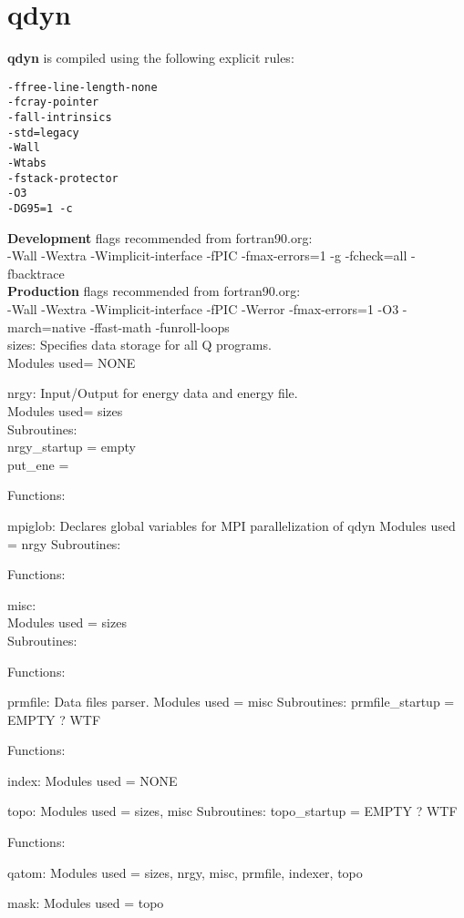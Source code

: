 \documentclass[10pt, oneside, pdftex]{article}
\begin{document}
\section{qdyn}
\label{qdyn}
\textbf{qdyn} is compiled using the following explicit rules:
\begin{Verbatim}
-ffree-line-length-none
-fcray-pointer
-fall-intrinsics
-std=legacy
-Wall
-Wtabs
-fstack-protector
-O3
-DG95=1 -c
\end{Verbatim}

\textbf{Development} flags recommended from fortran90.org:\\
-Wall -Wextra -Wimplicit-interface -fPIC -fmax-errors=1 -g -fcheck=all -fbacktrace\\

\textbf{Production} flags recommended from fortran90.org:\\
-Wall -Wextra -Wimplicit-interface -fPIC -Werror -fmax-errors=1 -O3 -march=native -ffast-math -funroll-loops\\

sizes: Specifies data storage for all Q programs.\\
Modules used= NONE

nrgy: Input/Output for energy data and energy file.\\
Modules used= sizes\\
Subroutines:\\
  nrgy\_startup = empty\\
  put\_ene =

Functions:

mpiglob: Declares global variables for MPI parallelization of qdyn
Modules used = nrgy
Subroutines:

Functions:


misc:\\
Modules used = sizes\\
Subroutines:

Functions:


prmfile: Data files parser.
Modules used = misc
Subroutines:
  prmfile\_startup = EMPTY ? WTF


Functions:


index:
Modules used = NONE


topo:
Modules used = sizes, misc
Subroutines:
  topo\_startup = EMPTY ? WTF


Functions:


qatom:
Modules used = sizes, nrgy, misc, prmfile, indexer, topo


mask:
Modules used = topo
\end{document}
